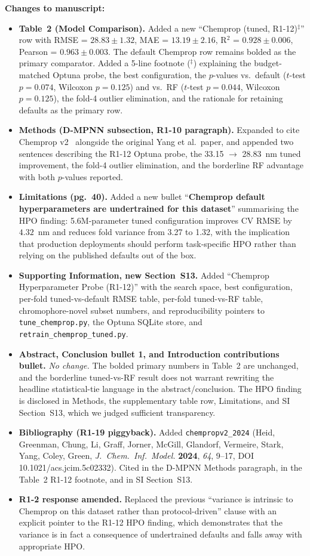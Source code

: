 \documentclass[11pt]{article}
\newenvironment{changes}{%
  \noindent\textbf{Changes to manuscript:}
  \begin{itemize}[leftmargin=2em,itemsep=2pt]}{%
  \end{itemize}\medskip}
\begin{document}
\begin{changes}
  \item \textbf{Table~2 (Model Comparison).} Added a new ``Chemprop (tuned, R1-12)$^{\ddagger}$'' row with RMSE = $28.83 \pm 1.32$, MAE = $13.19 \pm 2.16$, R$^2$ = $0.928 \pm 0.006$, Pearson = $0.963 \pm 0.003$. The default Chemprop row remains bolded as the primary comparator. Added a 5-line footnote ($^{\ddagger}$) explaining the budget-matched Optuna probe, the best configuration, the $p$-values vs.\ default ($t$-test $p = 0.074$, Wilcoxon $p = 0.125$) and vs.\ RF ($t$-test $p = 0.044$, Wilcoxon $p = 0.125$), the fold-4 outlier elimination, and the rationale for retaining defaults as the primary row.
  \item \textbf{Methods (D-MPNN subsection, R1-10 paragraph).} Expanded to cite Chemprop v2~\cite{chempropv2_2024} alongside the original Yang et al.\ paper, and appended two sentences describing the R1-12 Optuna probe, the 33.15 $\to$ 28.83~nm tuned improvement, the fold-4 outlier elimination, and the borderline RF advantage with both $p$-values reported.
  \item \textbf{Limitations (pg.\ 40).} Added a new bullet ``\textbf{Chemprop default hyperparameters are undertrained for this dataset}'' summarising the HPO finding: 5.6M-parameter tuned configuration improves CV RMSE by $4.32$~nm and reduces fold variance from 3.27 to 1.32, with the implication that production deployments should perform task-specific HPO rather than relying on the published defaults out of the box.
  \item \textbf{Supporting Information, new Section~S13.} Added ``Chemprop Hyperparameter Probe (R1-12)'' with the search space, best configuration, per-fold tuned-vs-default RMSE table, per-fold tuned-vs-RF table, chromophore-novel subset numbers, and reproducibility pointers to \texttt{tune\_chemprop.py}, the Optuna SQLite store, and \texttt{retrain\_chemprop\_tuned.py}.
  \item \textbf{Abstract, Conclusion bullet 1, and Introduction contributions bullet.} \emph{No change.} The bolded primary numbers in Table~2 are unchanged, and the borderline tuned-vs-RF result does not warrant rewriting the headline statistical-tie language in the abstract/conclusion. The HPO finding is disclosed in Methods, the supplementary table row, Limitations, and SI Section~S13, which we judged sufficient transparency.
  \item \textbf{Bibliography (R1-19 piggyback).} Added \texttt{chempropv2\_2024} (Heid, Greenman, Chung, Li, Graff, Jorner, McGill, Glandorf, Vermeire, Stark, Yang, Coley, Green, \textit{J.\ Chem.\ Inf.\ Model.} \textbf{2024}, \textit{64}, 9--17, DOI 10.1021/acs.jcim.5c02332). Cited in the D-MPNN Methods paragraph, in the Table~2 R1-12 footnote, and in SI Section~S13.
  \item \textbf{R1-2 response amended.} Replaced the previous ``variance is intrinsic to Chemprop on this dataset rather than protocol-driven'' clause with an explicit pointer to the R1-12 HPO finding, which demonstrates that the variance is in fact a consequence of undertrained defaults and falls away with appropriate HPO.
\end{changes}
\end{document}
